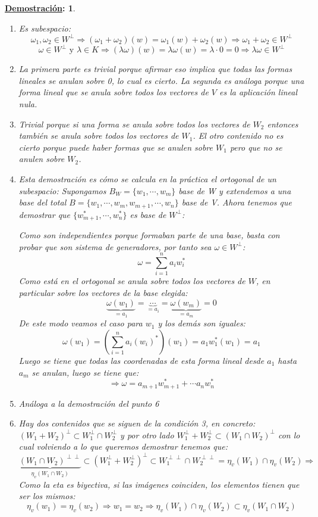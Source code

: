 \documentclass[10pt,a4paper,openright]{book}
\theoremstyle{break}
\newtheorem*{demo}{\underline{Demostración}:}
\begin{document}
\begin{demo}
\begin{enumerate}
\item Es subespacio:
$$\omega_1,\omega_2\in W^\perp \Rightarrow (\omega_1+\omega_2)(w)=\omega_1(w)+\omega_2(w)\Rightarrow \omega_1+\omega_2\in W^\perp$$
$$\omega \in W^\perp \mbox{ y }\lambda \in K \Rightarrow (\lambda \omega)(w)=\lambda \omega(w)=\lambda \cdot 0=0\Rightarrow \lambda\omega\in W^\perp$$

\item La primera parte es trivial porque afirmar eso implica que todas las formas lineales se anulan sobre 0, lo cual es cierto. La segunda es análoga porque una forma lineal que se anula sobre todos los vectores de $V$ es la aplicación lineal nula.

\item Trivial porque si una forma se anula sobre todos los vectores de $W_2$ entonces también se anula sobre todos los vectores de $W_1$. El otro contenido no es cierto porque puede haber formas que se anulen sobre $W_1$ pero que no se anulen sobre $W_2$.

\item Esta demostración es cómo se calcula en la práctica el ortogonal de un subespacio:
Supongamos $B_W=\{w_1, \cdots , w_m\}$ base de W y extendemos a una base del total $B=\{w_1, \cdots , w_m, w_{m+1}, \cdots, w_n\}$ base de V. Ahora tenemos que demostrar que $\{w_{m+1}^*, \cdots, w_n^*\}$ es base de $W^\perp$:

Como son independientes porque formaban parte de una base, basta con probar que son sistema de generadores, por tanto sea $\omega \in W^\perp$:
$$\omega = \sum_{i=1}^n a_iw_i^*$$
Como está en el ortogonal se anula sobre todos los vectores de $W$, en particular sobre los vectores de la base elegida:
$$\underbrace{\omega(w_1)}_{=a_1}=\underbrace{\cdots}_{=a_i} = \underbrace{\omega(w_m)}_{=a_m}=0$$
De este modo veamos el caso para $w_1$ y los demás son iguales:
$$\omega(w_1)=\left(\sum_{i=1}^n a_i(w_i)^*\right)(w_1)=a_1w_1^*(w_1)=a_1$$
Luego se tiene que todas las coordenadas de esta forma lineal desde $a_1$ hasta $a_m$ se anulan, luego se tiene que:
$$\Rightarrow \omega = a_{m+1}w_{m+1}^*+\cdots a_nw_n^*$$

\item Análoga a la demostración del punto 6

\item Hay dos contenidos que se siguen de la condición 3, en concreto: $(W_1+W_2)^\perp \subset W_1^\perp \cap W_2^\perp$ y por otro lado $W_1^\perp+W_2^\perp\subset (W_1\cap W_2)^\perp$ con lo cual volviendo a lo que queremos demostrar tenemos que:
$$\underbrace{(W_1\cap W_2)^{\perp\perp}}_{\eta_v(W_1\cap W_2)}\subset (W_1^\perp + W_2^\perp)^\perp\subset W_1^{\perp\perp}\cap W_2^{\perp\perp}=\eta_v(W_1)\cap \eta_v(W_2)\Rightarrow $$
Como la eta es biyectiva, si las imágenes coinciden, los elementos tienen que ser los mismos:
$$\eta_v(w_1)=\eta_v(w_2)\Rightarrow w_1=w_2\Rightarrow \eta_v(W_1)\cap \eta_v(W_2) \subset \eta_v(W_1\cap W_2)$$


\end{enumerate}
\end{demo}
\end{document}
